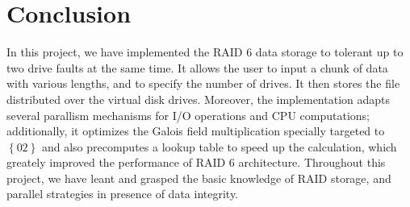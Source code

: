\section{Conclusion}

In this project, we have implemented the RAID 6 data storage to tolerant up to two drive faults at the same time. It allows the user to input a chunk of data with various lengths, and to specify the number of drives. It then stores the file distributed over the virtual disk drives. Moreover, the implementation adapts several parallism mechanisms for I/O operations and CPU computations; additionally, it optimizes the Galois field multiplication specially targeted to $\left\{02\right\}$ and also precomputes a lookup table to speed up the calculation, which greately improved the performance of RAID 6 architecture. Throughout this project, we have leant and grasped the basic knowledge of RAID storage, and parallel strategies in presence of data integrity.
